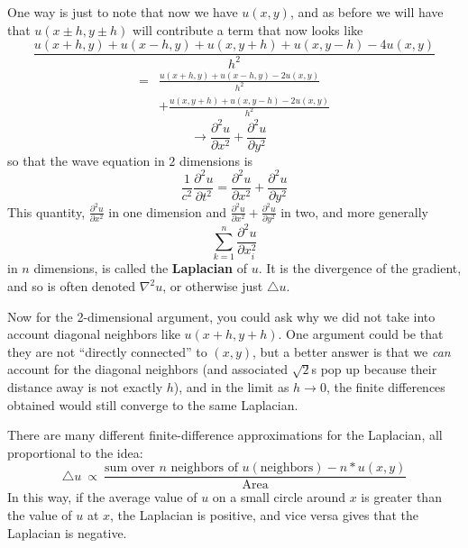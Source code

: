 	One way is just to note that now we have $u(x,y)$, and as before we will have that $u(x\pm h, y \pm h)$ will contribute a term that now looks like
	\begin{equation*}
		\frac{u(x+h,y) + u(x-h,y) + u(x,y+h) + u(x,y-h) - 4 u(x,y)}{h^2}
	\end{equation*}
	\begin{align*}
		 =  &\frac{u(x+h,y) + u(x-h,y)- 2u(x,y)}{h^2}\\ 
		 &+ \frac{u(x,y+h) + u(x,y-h) - 2 u(x,y)}{h^2} 
	\end{align*}
	\begin{equation*}
		\rightarrow \frac{\partial^2 u}{\partial x^2} + \frac{\partial^2 u}{\partial y^2} ~~~~
	\end{equation*}
	so that the wave equation in $2$ dimensions is
	\begin{equation}
		\frac{1}{c^2} \frac{\partial^2 u}{\partial t^2} = \frac{\partial^2 u}{\partial x^2} + \frac{\partial^2 u}{\partial y^2}
	\end{equation}
	This quantity, $\frac{\partial^2 u}{\partial x^2}$ in one dimension and $\frac{\partial^2 u}{\partial x^2} + \frac{\partial^2 u}{\partial y^2}$ in two, and more generally
	\begin{equation*}
		\sum_{k=1}^n \frac{\partial^2 u}{\partial x_i^2}
	\end{equation*}
	in $n$ dimensions, is called the \textbf{Laplacian} of $u$. It is the divergence of the gradient, and so is often denoted $\nabla^2 u$, or otherwise just $\triangle u$. 
	
	Now for the 2-dimensional argument, you could ask why we did not take into account diagonal neighbors like $u(x+h, y+h)$. One argument could be that they are not ``directly connected'' to $(x,y)$, but a better answer is that we \emph{can} account for the diagonal neighbors (and associated $\sqrt 2$s pop up because their distance away is not exactly $h$), and in the limit as $h \rightarrow 0$, the finite differences obtained would still converge to the same Laplacian. 
	\begin{concept}
	There are many different finite-difference approximations for the Laplacian, all proportional to the idea:
		\begin{equation*}
			\triangle  u ~\propto~ \frac{ \text{sum over } n \text{ neighbors of } u(\text{neighbors}) - n * u(x,y) }{\text{Area}}
		\end{equation*}
		In this way, if the average value of $u$ on a small circle around $x$ is greater than the value of $u$ at $x$, the Laplacian is positive, and vice versa gives that the Laplacian is negative. 
	\end{concept}
	
